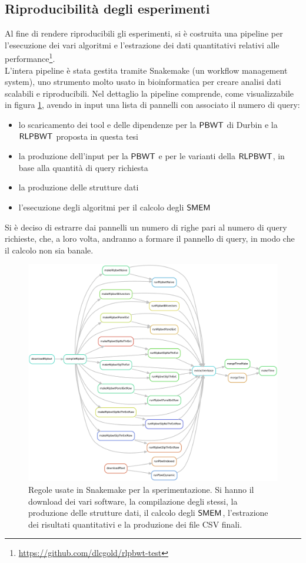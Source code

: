 \subsection{Riproducibilità degli esperimenti}
Al fine di rendere riproducibili gli esperimenti, si è costruita una pipeline
per l'esecuzione dei vari algoritmi e l'estrazione dei dati quantitativi
relativi alle
performance\footnote{\url{https://github.com/dlcgold/rlpbwt-test}}.\\
L'intera pipeline è stata gestita tramite Snakemake \cite{snakemake}
(un workflow management system), uno strumento molto usato in
bioinformatica per creare analisi dati scalabili e riproducibili. Nel
dettaglio la pipeline comprende, come visualizzabile in figura \ref{fig:snake},
avendo in input una lista di pannelli con associato il numero di query:
\begin{itemize}
  \item lo scaricamento dei tool e delle dipendenze per la $\mbox{\rm {\sf PBWT}}$ di
  Durbin e la $\mbox{\rm {\sf RLPBWT}}$ proposta in questa tesi
  \item la produzione dell'input per la $\mbox{\rm {\sf PBWT}}$ e per le varianti della
  $\mbox{\rm {\sf RLPBWT}}$, in base alla quantità di query richiesta
  \item la produzione delle strutture dati
  \item l'esecuzione degli algoritmi per il calcolo degli $\mbox{\rm {\sf SMEM}}$
\end{itemize}
Si è deciso di estrarre dai pannelli un numero di righe pari al numero di 
query richieste, che, a loro volta, andranno a formare il pannello di
query, in modo che il calcolo non sia banale.\\
\begin{figure}
  \centering
  \includegraphics[width=\textwidth]{img/final_dag_r.pdf}
  \caption{Regole usate in Snakemake per la sperimentazione. Si hanno
  il download  dei vari software, la compilazione degli stessi, la produzione
  delle strutture dati,
  il calcolo degli $\mbox{\rm {\sf SMEM}}$, l'estrazione dei risultati
  quantitativi e la produzione dei file CSV finali.}
  \label{fig:snake}
\end{figure}
